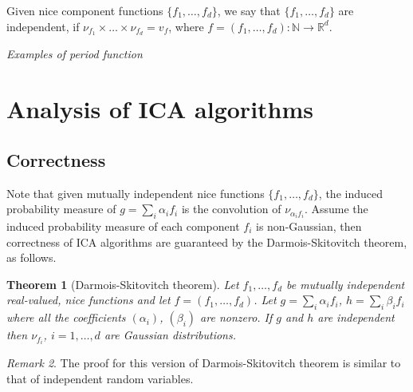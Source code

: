 \documentclass[english]{article} %
\providecommand{\remarkname}{Remark}
\providecommand{\theoremname}{Theorem}
\newcommand{\real}{\mathbb{R}}
\renewcommand{\natural}{\mathbb{N}}
\providecommand{\remarkname}{Remark}
\providecommand{\theoremname}{Theorem}
\theoremstyle{plain}
\newtheorem{thm}{\protect\theoremname}
\theoremstyle{remark}
\newtheorem{rem}[thm]{\protect\remarkname}
\theoremstyle{claim}
\theoremstyle{plain}
\begin{document}
Given nice component functions $\{f_1,\ldots,f_d\}$, we say that $\{f_1,\ldots,f_d\}$ are independent, if $\nu_{f_1}\times\ldots\times\nu_{f_d} = v_f$, where $f = (f_1,\ldots,f_d):\natural \rightarrow \real^d$.

\emph{Examples of period function}

\section{Analysis of ICA algorithms}
\subsection{Correctness}
Note that given mutually independent nice functions $\{f_1,\ldots,f_d\}$, the induced probability measure of $g = \sum_i \alpha_i f_i$ is the convolution of $\nu_{\alpha_i f_i}$.
Assume the induced probability measure of each component $f_i$ is non-Gaussian, then correctness of ICA algorithms are guaranteed by the Darmois-Skitovitch theorem, as follows.
\begin{thm}[Darmois-Skitovitch theorem]
Let $f_1,\ldots,f_d$ be mutually independent real-valued, nice functions and let $f = (f_1,\ldots,f_d)$.
Let $g = \sum_i \alpha_i f_i$, $h = \sum_i \beta_i f_i$ where all the coefficients $(\alpha_i)$, $(\beta_i)$ are nonzero.
If $g$ and $h$ are independent then $\nu_{f_i}$, $i=1,\ldots,d$ are Gaussian distributions.
\end{thm}
\begin{rem}
The proof for this version of Darmois-Skitovitch theorem is similar to that of independent random variables.
\end{rem}
\end{document}
